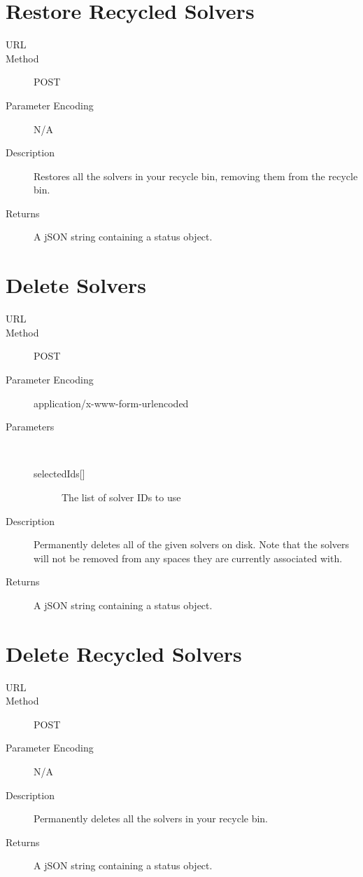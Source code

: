 \section{Restore Recycled Solvers}
\begin{description}
\item [URL] 
\item [Method] POST
\item [Parameter Encoding] N/A
\item [Description] Restores all the solvers in your recycle bin, removing them from the recycle bin.
\item [Returns] A jSON string containing a status object.
\end{description}


\section{Delete Solvers}
\begin{description}
\item [URL] 
\item [Method] POST
\item [Parameter Encoding] application/x-www-form-urlencoded
\item [Parameters] \
	\begin{description}
	\item [{selectedIds[]}]  The list of solver IDs to use
	\end{description}
\item [Description] Permanently deletes all of the given solvers on disk. Note that the solvers will not be removed from any spaces they are currently associated with.
\item [Returns] A jSON string containing a status object.
\end{description}


\section{Delete Recycled Solvers}
\begin{description}
\item [URL] 
\item [Method] POST
\item [Parameter Encoding] N/A
\item [Description] Permanently deletes all the solvers in your recycle bin.
\item [Returns] A jSON string containing a status object.
\end{description}


